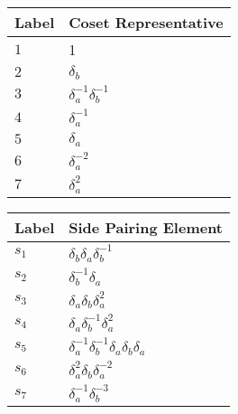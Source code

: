 \documentclass{article}
\begin{document}

\begin{center}
\begin{tabular}{ll}
\toprule
Label & Coset Representative\\
\midrule
$1$ & 1 \\
$2$ & $\delta_b^{}$ \\
$3$ & $\delta_a^{-1}\delta_b^{-1}$ \\
$4$ & $\delta_a^{-1}$ \\
$5$ & $\delta_a^{}$ \\
$6$ & $\delta_a^{-2}$ \\
$7$ & $\delta_a^{2}$ \\
\bottomrule
\end{tabular}
\hfill
\begin{tabular}{ll}
\toprule
Label & Side Pairing Element\\
\midrule
$s_{1}$ & $\delta_b^{}\delta_a^{}\delta_b^{-1}$ \\
$s_{2}$ & $\delta_b^{-1}\delta_a^{}$ \\
$s_{3}$ & $\delta_a^{}\delta_b^{}\delta_a^{2}$ \\
$s_{4}$ & $\delta_a^{}\delta_b^{-1}\delta_a^{2}$ \\
$s_{5}$ & $\delta_a^{-1}\delta_b^{-1}\delta_a^{}\delta_b^{}\delta_a^{}$ \\
$s_{6}$ & $\delta_a^{2}\delta_b^{}\delta_a^{-2}$ \\
$s_{7}$ & $\delta_a^{-1}\delta_b^{-3}$ \\
\bottomrule
\end{tabular}
\end{center}

\thispagestyle{empty}
\end{document}
